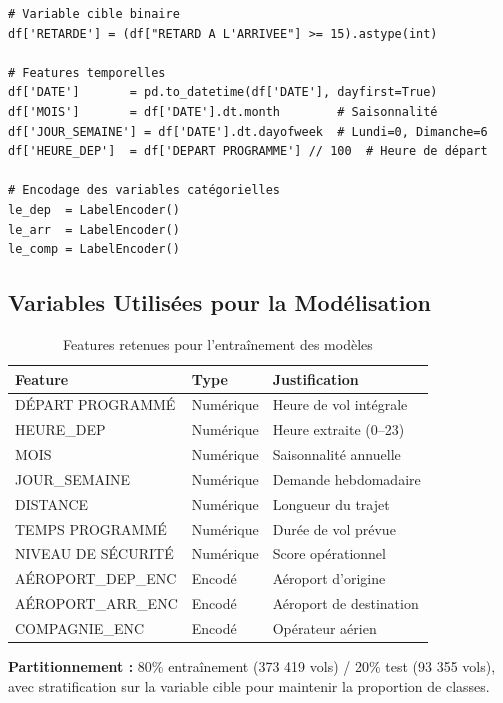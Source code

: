 \documentclass[12pt,a4paper]{article}
\begin{document}
\begin{lstlisting}[caption={Création des features temporelles et encodage}]
# Variable cible binaire
df['RETARDE'] = (df["RETARD A L'ARRIVEE"] >= 15).astype(int)

# Features temporelles
df['DATE']       = pd.to_datetime(df['DATE'], dayfirst=True)
df['MOIS']       = df['DATE'].dt.month        # Saisonnalité
df['JOUR_SEMAINE'] = df['DATE'].dt.dayofweek  # Lundi=0, Dimanche=6
df['HEURE_DEP']  = df['DEPART PROGRAMME'] // 100  # Heure de départ

# Encodage des variables catégorielles
le_dep  = LabelEncoder()
le_arr  = LabelEncoder()
le_comp = LabelEncoder()
\end{lstlisting}

\subsection{Variables Utilisées pour la Modélisation}

\begin{table}[H]
  \centering
  \caption{Features retenues pour l'entraînement des modèles}
  \begin{tabular}{llp{6cm}}
    \toprule
    \textbf{Feature} & \textbf{Type} & \textbf{Justification} \\
    \midrule
    DÉPART PROGRAMMÉ & Numérique & Heure de vol intégrale \\
    HEURE\_DEP & Numérique & Heure extraite (0–23) \\
    MOIS & Numérique & Saisonnalité annuelle \\
    JOUR\_SEMAINE & Numérique & Demande hebdomadaire \\
    DISTANCE & Numérique & Longueur du trajet \\
    TEMPS PROGRAMMÉ & Numérique & Durée de vol prévue \\
    NIVEAU DE SÉCURITÉ & Numérique & Score opérationnel \\
    AÉROPORT\_DEP\_ENC & Encodé & Aéroport d'origine \\
    AÉROPORT\_ARR\_ENC & Encodé & Aéroport de destination \\
    COMPAGNIE\_ENC & Encodé & Opérateur aérien \\
    \bottomrule
  \end{tabular}
\end{table}

\textbf{Partitionnement :} 80\% entraînement (373 419 vols) / 20\% test (93 355 vols),
avec stratification sur la variable cible pour maintenir la proportion de classes.
\end{document}
